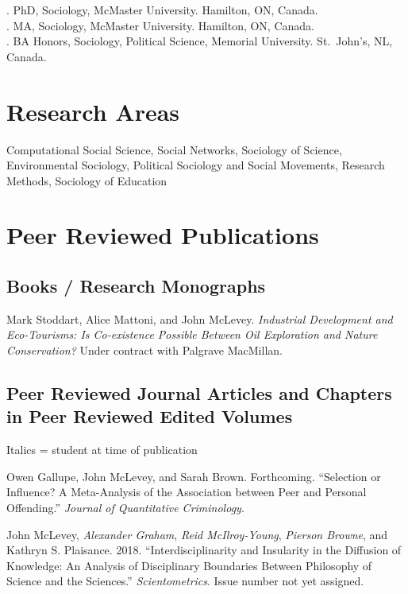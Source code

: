 . PhD, Sociology, McMaster University. Hamilton, ON, Canada.\\
. MA, Sociology, McMaster University. Hamilton, ON, Canada.\\
. BA Honors, Sociology, Political Science, Memorial University.
St.~John's, NL, Canada.

\section{Research Areas}\label{research-areas}

Computational Social Science, Social Networks, Sociology of Science,
Environmental Sociology, Political Sociology and Social Movements,
Research Methods, Sociology of Education

\section{Peer Reviewed Publications}\label{peer-reviewed-publications}

\subsection{Books / Research
Monographs}\label{books-research-monographs}

\ind Mark Stoddart, Alice Mattoni, and John McLevey. \emph{Industrial Development and Eco-Tourisms: Is Co-existence Possible Between Oil Exploration and Nature Conservation?} Under contract with Palgrave MacMillan.

\subsection{Peer Reviewed Journal Articles and Chapters in Peer Reviewed
Edited
Volumes}\label{peer-reviewed-journal-articles-and-chapters-in-peer-reviewed-edited-volumes}

\footnotesize{\ind Italics = student at time of publication}\bigskip
\normalsize

\ind Owen Gallupe, John McLevey, and Sarah Brown. Forthcoming. ``Selection or Influence? A Meta-Analysis of the Association between Peer and Personal Offending.'' \emph{Journal of Quantitative Criminology}.

\ind John McLevey, \emph{Alexander Graham}, \emph{Reid McIlroy-Young}, \emph{Pierson Browne}, and Kathryn S. Plaisance. 2018. ``Interdisciplinarity and Insularity in the Diffusion of Knowledge: An Analysis of Disciplinary Boundaries Between Philosophy of Science and the Sciences.'' \emph{Scientometrics}. Issue number not yet assigned.

